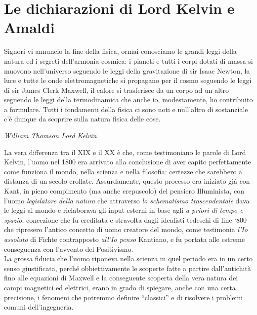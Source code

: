 \documentclass[a4paper,12pt]{report}
\begin{document}
\section{Le dichiarazioni di Lord Kelvin e Amaldi}
\setlength{\epigraphwidth}{0.8\textwidth}
\epigraph{Signori vi annuncio la fine
della fisica, ormai conosciamo le grandi leggi della natura ed i segreti dell’armonia
cosmica: i pianeti e tutti i corpi dotati di massa si muovono nell’universo seguendo le leggi
della gravitazione di sir Isaac Newton, la luce e tutte le onde elettromagnetiche si
propagano per il cosmo seguendo le leggi di sir James Clerk Maxwell, il calore si
trasferisce da un corpo ad un altro seguendo le leggi della termodinamica che anche io,
modestamente, ho contribuito a formulare. Tutti i fondamenti della fisica ci sono noti e
null’altro di sostanziale c’è dunque da scoprire sulla natura fisica delle cose.}{\textit{William Thomson Lord Kelvin}}

La vera differenza tra il XIX e il XX è che, come testimoniano le parole di Lord Kelvin, l’uomo nel 1800 era arrivato alla conclusione di aver capito perfettamente come funziona il mondo, nella scienza e nella filosofia: certezze che sarebbero a distanza di un secolo crollate. Assurdamente, questo processo era iniziato già con Kant, in pieno compimento (ma anche crepuscolo) del pensiero Illuminista, con l’uomo \textit{legislatore della natura} che attraverso \textit{lo schematismo trascendentale} dava le leggi al mondo e rielaborava gli input esterni in base agli \textit{a priori di tempo e spazio}\cite{ragionpura}; concezione che fu ereditata e stravolta dagli idealisti tedeschi di fine ‘800 che ripresero l’antico concetto di uomo creatore del mondo, come testimonia \textit{l’Io assoluto}\cite{dottrina} di Fichte contrapposto \textit{all’Io penso} Kantiano, e fu portata alle estreme conseguenza con l’avvento del Positivismo. \\
La grossa fiducia che l’uomo riponeva nella scienza in quel periodo era in un certo senso giustificata, perché obbiettivamente le scoperte fatte a partire dall’antichità fino alle equazioni di Maxwell e la conseguente scoperta della vera natura dei campi magnetici ed elettrici, erano in grado di spiegare, anche con una certa precisione, i fenomeni che potremmo definire “classici” e di risolvere i problemi comuni dell’ingegneria. 
\end{document}
